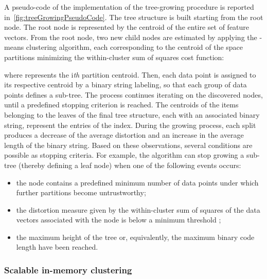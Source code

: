 A pseudo-code of the implementation of the tree-growing procedure is reported in~\ref{fig:treeGrowingPseudoCode}.
The tree structure is built starting from the root node. 
The root node is represented by the centroid of the entire set of feature vectors. From the root node, two new child nodes are estimated by applying the \mbox{-means} clustering algorithm, each corresponding to the centroid of the space partitions  minimizing the within-cluster sum of squares cost function:

where  represents the i\emph{th} partition centroid. Then, each data point is assigned to its respective centroid by a binary string labeling, so that each group of data points defines a sub-tree.
The process continues iterating on the discovered nodes, until a predefined stopping criterion is reached.
The centroids of the items belonging to the leaves of the final tree structure, each with an associated binary string, represent the entries of the index.
During the growing process, each split produces a decrease of the average distortion and an increase in the average length of the binary string.
Based on these observations, several conditions are possible as stopping criteria.
For example, the algorithm can stop growing a sub-tree (thereby defining a leaf node) when one of the following events occurs:
\begin{itemize}
	\item the node contains a predefined minimum number of data points  under which further partitions become untrustworthy;
	\item the distortion measure given by the within-cluster sum of squares of the data vectors associated with the node is below a minimum threshold ;
	\item the maximum height of the tree  or, equivalently, the maximum binary code length have been reached.
\end{itemize}




















\subsubsection{Scalable in-memory clustering}
\label{sec:inmem_clustering}

